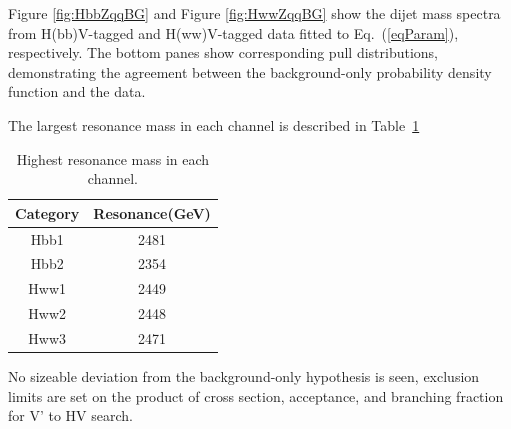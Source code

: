 Figure \ref{fig:HbbZqqBG} and Figure \ref{fig:HwwZqqBG} show the dijet
 mass spectra from
H(bb)V-tagged and H(ww)V-tagged data 
fitted to Eq.~(\ref{eqParam}), respectively. 
The bottom panes show corresponding pull
distributions, demonstrating the agreement between the background-only
probability density function and the data.

The largest resonance mass in each channel is described 
in Table~\ref{table:highestMass}

\begin{table}[htbp]
\begin{center}
\caption{Highest resonance mass in each channel.}
\label{table:highestMass}
\begin{tabular}{cc}
\hline
Category & Resonance(GeV) \\ \hline
Hbb1 & 2481 \\ 
Hbb2 & 2354 \\ 
Hww1 & 2449 \\
Hww2 & 2448 \\ 
Hww3 & 2471 \\ \hline
\end{tabular}
\end{center}
\end{table}



No sizeable deviation from the background-only hypothesis is seen,
exclusion limits are set on the product of cross section, 
acceptance, and branching fraction for
V' to HV search. 





